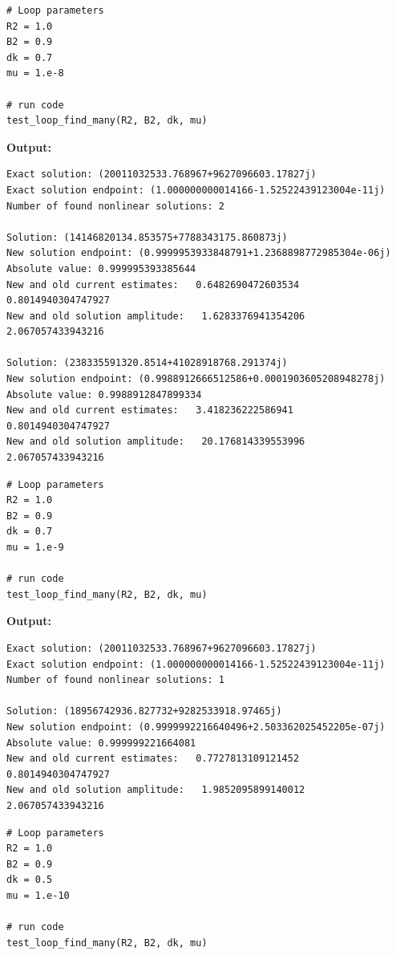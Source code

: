 \documentclass{article}
\begin{document}
\begin{lstlisting}
# Loop parameters
R2 = 1.0
B2 = 0.9
dk = 0.7
mu = 1.e-8

# run code
test_loop_find_many(R2, B2, dk, mu)\end{lstlisting}

\textbf{Output:}\begin{verbatim}
Exact solution: (20011032533.768967+9627096603.17827j)
Exact solution endpoint: (1.000000000014166-1.52522439123004e-11j)
Number of found nonlinear solutions: 2

Solution: (14146820134.853575+7788343175.860873j)
New solution endpoint: (0.9999953933848791+1.2368898772985304e-06j) Absolute value: 0.999995393385644
New and old current estimates:   0.6482690472603534    0.8014940304747927
New and old solution amplitude:   1.6283376941354206    2.067057433943216

Solution: (238335591320.8514+41028918768.291374j)
New solution endpoint: (0.9988912666512586+0.0001903605208948278j) Absolute value: 0.9988912847899334
New and old current estimates:   3.418236222586941    0.8014940304747927
New and old solution amplitude:   20.176814339553996    2.067057433943216

\end{verbatim}

\begin{lstlisting}
# Loop parameters
R2 = 1.0
B2 = 0.9
dk = 0.7
mu = 1.e-9

# run code
test_loop_find_many(R2, B2, dk, mu)\end{lstlisting}

\textbf{Output:}\begin{verbatim}
Exact solution: (20011032533.768967+9627096603.17827j)
Exact solution endpoint: (1.000000000014166-1.52522439123004e-11j)
Number of found nonlinear solutions: 1

Solution: (18956742936.827732+9282533918.97465j)
New solution endpoint: (0.9999992216640496+2.503362025452205e-07j) Absolute value: 0.999999221664081
New and old current estimates:   0.7727813109121452    0.8014940304747927
New and old solution amplitude:   1.9852095899140012    2.067057433943216

\end{verbatim}

\begin{lstlisting}
# Loop parameters
R2 = 1.0
B2 = 0.9
dk = 0.5
mu = 1.e-10

# run code
test_loop_find_many(R2, B2, dk, mu)\end{lstlisting}
\end{document}
